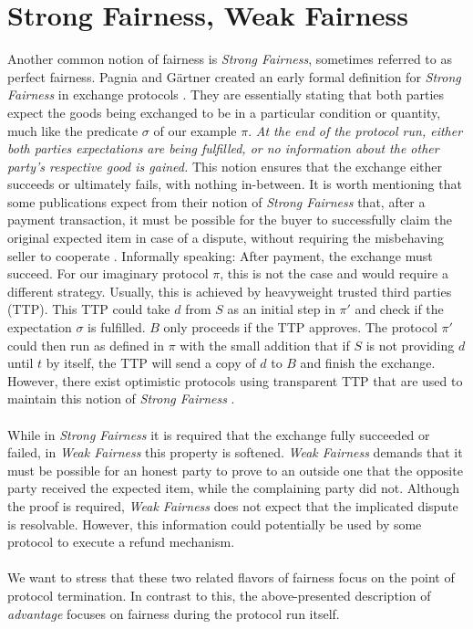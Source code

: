 \documentclass{cacthesis}
\newcounter{protocol}
\begin{document}
        \section{Strong Fairness, Weak Fairness}
        \label{sec:StrongFairnessWeakFairness}
        Another common notion of fairness is \textit{Strong Fairness}, sometimes referred to as perfect fairness. Pagnia and Gärtner created an early formal definition for \textit{Strong Fairness} in exchange protocols \cite{Pagnia99onthe}. They are essentially stating that both parties expect the goods being exchanged to be in a particular condition or quantity, much like the predicate $\sigma$ of our example $\pi$. \textit{At the end of the protocol run, either both parties expectations are being fulfilled, or no information about the other party's respective good is gained.} This notion ensures that the exchange either succeeds or ultimately fails, with nothing in-between.
        It is worth mentioning that some publications expect from their notion of \textit{Strong Fairness} that, after a payment transaction, it must be possible for the buyer to successfully claim the original expected item in case of a dispute, without requiring the misbehaving seller to cooperate \cite{10.1007/3-540-36552-4_31}. Informally speaking: After payment, the exchange must succeed. For our imaginary protocol $\pi$, this is not the case and would require a different strategy. Usually, this is achieved by heavyweight trusted third parties (TTP). This TTP could take $d$ from $S$ as an initial step in $\pi'$ and check if the expectation $\sigma$ is fulfilled. $B$ only proceeds if the TTP approves. The protocol $\pi'$ could then run as defined in $\pi$ with the small addition that if $S$ is not providing $d$ until $t$ by itself, the TTP will send a copy of $d$ to $B$ and finish the exchange. However, there exist optimistic protocols using transparent TTP that are used to maintain this notion of \textit{Strong Fairness} \cite{10.1007/3-540-36552-4_31} \cite{6982058}. \\\\
        While in \textit{Strong Fairness} it is required that the exchange fully succeeded or failed, in \textit{Weak Fairness} this property is softened. 
        \textit{Weak Fairness} demands that it must be possible for an honest party to prove to an outside one that the opposite party received the expected item, while the complaining party did not. Although the proof is required, \textit{Weak Fairness} does not expect that the implicated dispute is resolvable. However, this information could potentially be used by some protocol to execute a refund mechanism. \\\\
        We want to stress that these two related flavors of fairness focus on the point of protocol termination. In contrast to this, the above-presented description of \textit{advantage} focuses on fairness during the protocol run itself.
        
\end{document}
